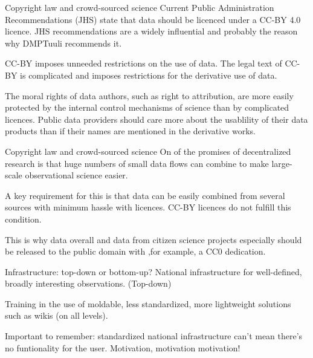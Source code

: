 \documentclass{beamer}
\begin{document}
\begin{frame}{Copyright law and crowd-sourced science}
  Current Public Administration Recommendations (JHS) state that data should be licenced under a CC-BY 4.0 licence. JHS recommendations are a widely influential and probably the reason why DMPTuuli recommends it.

  CC-BY imposes unneeded restrictions on the use of data. The legal text of CC-BY is complicated and imposes restrictions for the derivative use of data.

  The moral rights of data authors, such as right to attribution, are more easily protected by the internal control mechanisms of science than by complicated licences. Public data providers should care more about the usablility of their data products than if their names are mentioned in the derivative works.
\end{frame}


\begin{frame}{Copyright law and crowd-sourced science}
  On of the promises of decentralized research is that huge numbers of small data flows can combine to make large-scale observational science easier.

  A key requirement for this is that data can be easily combined from several sources with minimum hassle with licences. CC-BY licences do not fulfill this condition.

  This is why data overall and data from citizen science projects especially should be released to the public domain with ,for example, a CC0 dedication.
\end{frame}


\begin{frame}{Infrastructure: top-down or bottom-up?}
  National infrastructure for well-defined, broadly interesting observations. (Top-down)
  
  Training in the use of moldable, less standardized, more lightweight solutions such as wikis (on all levels).

  Important to remember: standardized national infrastructure can't mean there's no funtionality for the user. Motivation, motivation motivation!
\end{frame}
\end{document}

